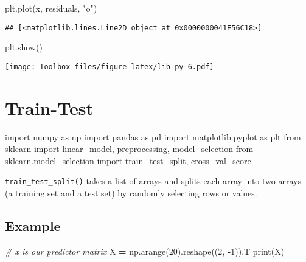 \documentclass[
]{book}
\newenvironment{Shaded}{\begin{snugshade}}{\end{snugshade}}
\newcommand{\BuiltInTok}[1]{#1}
\newcommand{\CommentTok}[1]{\textcolor[rgb]{0.56,0.35,0.01}{\textit{#1}}}
\newcommand{\DecValTok}[1]{\textcolor[rgb]{0.00,0.00,0.81}{#1}}
\newcommand{\ImportTok}[1]{#1}
\newcommand{\NormalTok}[1]{#1}
\newcommand{\OperatorTok}[1]{\textcolor[rgb]{0.81,0.36,0.00}{\textbf{#1}}}
\newcommand{\StringTok}[1]{\textcolor[rgb]{0.31,0.60,0.02}{#1}}
\begin{document}
\begin{Shaded}
\begin{Highlighting}[]
\NormalTok{plt.plot(x, residuals, }\StringTok{"o"}\NormalTok{)}
\end{Highlighting}
\end{Shaded}

\begin{verbatim}
## [<matplotlib.lines.Line2D object at 0x0000000041E56C18>]
\end{verbatim}

\begin{Shaded}
\begin{Highlighting}[]
\NormalTok{plt.show()}
\end{Highlighting}
\end{Shaded}

\texttt{[image: Toolbox\_files/figure-latex/lib-py-6.pdf]}

\hypertarget{train-test}{%
\section{Train-Test}\label{train-test}}

\begin{Shaded}
\begin{Highlighting}[]
\ImportTok{import}\NormalTok{ numpy }\ImportTok{as}\NormalTok{ np}
\ImportTok{import}\NormalTok{ pandas }\ImportTok{as}\NormalTok{ pd}
\ImportTok{import}\NormalTok{ matplotlib.pyplot }\ImportTok{as}\NormalTok{ plt}
\ImportTok{from}\NormalTok{ sklearn }\ImportTok{import}\NormalTok{ linear\_model, preprocessing, model\_selection}
\ImportTok{from}\NormalTok{ sklearn.model\_selection }\ImportTok{import}\NormalTok{ train\_test\_split, cross\_val\_score}
\end{Highlighting}
\end{Shaded}

\texttt{train\_test\_split()} takes a list of arrays and splits each array into two arrays (a training set and a test set) by randomly selecting rows or values.

\hypertarget{example}{%
\subsection{Example}\label{example}}

\begin{Shaded}
\begin{Highlighting}[]
\CommentTok{\# x is our predictor matrix}
\NormalTok{X }\OperatorTok{=}\NormalTok{ np.arange(}\DecValTok{20}\NormalTok{).reshape((}\DecValTok{2}\NormalTok{, }\OperatorTok{{-}}\DecValTok{1}\NormalTok{)).T}
\BuiltInTok{print}\NormalTok{(X)}
\end{Highlighting}
\end{Shaded}
\end{document}
